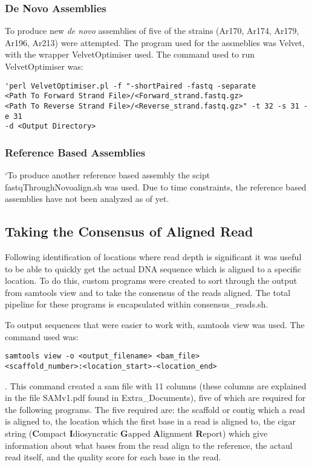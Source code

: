 \documentclass[12pt]{article}
\begin{document}
	\subsubsection{De Novo Assemblies}
	To produce new \textit{de novo} assemblies of five of the strains (Ar170, Ar174, Ar179, Ar196, Ar213) were attempted. The program used for the assmeblies was Velvet, with the wrapper VelvetOptimiser used. The command used to run VelvetOptimiser was: 
\begin{verbatim}
'perl VelvetOptimiser.pl -f "-shortPaired -fastq -separate 
<Path To Forward Strand File>/<Forward_strand.fastq.gz> 
<Path To Reverse Strand File>/<Reverse_strand.fastq.gz>" -t 32 -s 31 -e 31 
-d <Output Directory>
\end{verbatim}

	\subsubsection{Reference Based Assemblies}
	`To produce another reference based assembly the scipt fastqThroughNovoalign.sh was used. Due to time constraints, the reference based assemblies have not been analyzed as of yet.

\subsection{Taking the Consensus of Aligned Read}
	Following identification of locations where read depth is significant it was useful to be able to quickly get the actual DNA sequence which is aligned to a specific location. To do this, custom programs were created to sort through the output from samtools view and to take the consensus of the reads aligned. The total pipeline for these programs is encapsulated within consensus\_reads.sh.
	
	To output sequences that were easier to work with, samtools view was used. The command used was: \begin{verbatim}samtools view -o <output_filename> <bam_file> 
<scaffold_number>:<location_start>-<location_end>\end{verbatim} . This command created a sam file with 11 columns (these columns are explained in the file SAMv1.pdf found in Extra_Documents), five of which are required for the following programs. The five required are: the scaffold or contig which a read is aligned to, the location which the first base in a read is aligned to, the cigar string (\textbf{C}ompact \textbf{I}diosyncratic \textbf{G}apped \textbf{A}lignment \textbf{R}eport) which give information about what bases from the read align to the reference, the actaul read itself, and the quality score for each base in the read. 
\end{document}
